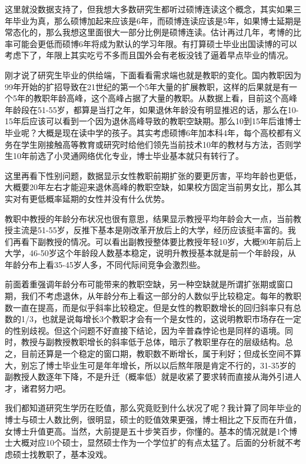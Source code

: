 \documentclass[]{tufte-book}
\begin{document}
这里就没数据支持了，但我想大多数研究生都听过硕博连读这个概念，其实如果三年毕业为真，那么硕博加起来应该是6年，而硕博连读应该是5年，如果博士延期是常态化的，那么我想这里面很大一部分比例是硕博连读。估计再过几年，考博的比率可能会更低而硕博6年将成为默认的学习年限。有打算硕士毕业出国读博的可以考虑下了，年限上其实吃亏不多而且国外会有老板没钱了逼着早点毕业的情况。

刚才说了研究生毕业的供给端，下面看看需求端也就是教职的变化。国内教职因为99年开始的扩招导致在21世纪的第一个5年大量的扩展教职，这样的后果就是有一个5年的教职年龄高峰，这个高峰占据了大量的教职。从数据上看，目前这个高峰年龄段在51-55岁，都算是当打之年，如果退休年龄没有明显推迟的话，那么在10-15年后应该可以看到一个因为退休高峰导致的教职空缺期。那么10到15年后谁博士毕业呢？大概是现在读中学的孩子。其实考虑硕博6年加本科4年，每个高校都有义务在学生刚接触高等教育或研究时给他们领先当前技术10年的教材与方法，否则学生10年前选了小灵通网络优化专业，博士毕业基本就只有转行了。

这里再看下性别问题，数据显示女性教职前期扩张的要更厉害，平均年龄也更低，大概要20年左右才能迎来退休高峰的教职空缺，如果校方固定当前男女比，那么其实对有更低概率延期的女性并没有什么优势。

教职中教授的年龄分布状况也很有意思，结果显示教授平均年龄会大一点，当前教授主流是51-55岁，反推下基本是刚改革开放后上的大学，经历应该挺丰富的。我们再看下副教授的情况。可以看出副教授整体要比教授年轻10岁，大概90年前后上大学，46-50岁这个年龄段人数基本稳定，说明升教授基本就是前一个年龄段，从年龄分布上看35-45岁人多，不同代际间竞争会激烈些。

前面着重强调年龄分布可能带来的教职空缺，另一种空缺就是所谓扩张期或窗口期，我们不考虑退休，从年龄分布上看这一部分的人数似乎比较稳定。每年的教职数一直在提高，而是似乎斜率比较稳定。但是女性的教职数增长的回归斜率只有总数的1/3，也就是说每增长3个教职才会有一个是女性的，这说明教职市场存在一定的性别歧视。但这个问题不好直接下结论，因为辛普森悖论也是同样的语境。同时，教授与副教授教职增长的斜率低于总体，暗示了教职里存在的层级结构。总之，目前还算是一个稳定的窗口期，教职数不断增长，属于利好；但成长空间不算大，别忘了博士毕业生可是年年增长，所以以后熬年限是肯定不行的，31-35岁的副教授人数逐年下降，不是升迁（概率低）就是收紧了要求转而直接从海外引进人才，诸君努力吧。

我们都知道研究生学历在贬值，那么究竟贬到什么状况了呢？我计算了同年毕业的博士与硕士人数比例，很明显，硕士的贬值效果更强，博士相比之下反而在升值，女博士升值更高。当然，大前提是五十步笑百步，你懂的。基本的情况就是1个博士大概对应10个硕士，显然硕士作为一个学位扩的有点太猛了。后面的分析就不考虑硕士找教职了，基本没戏。
\end{document}
